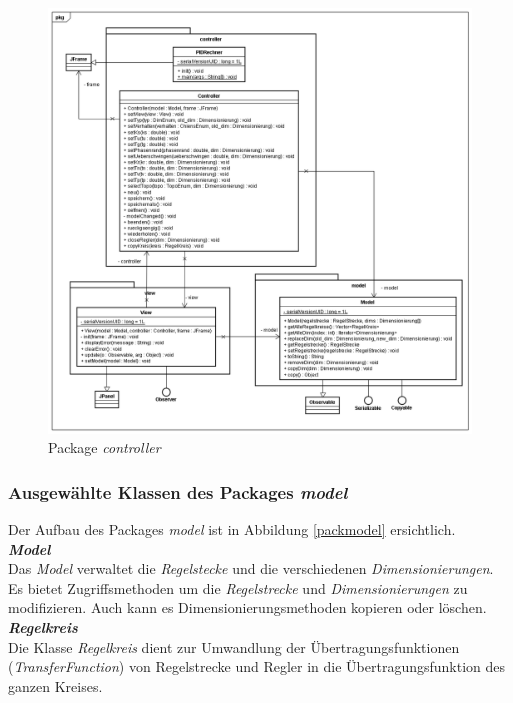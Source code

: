 \begin{figure}[p]
\centering
\includegraphics[width=1\textwidth]{packcontrl.png}
\caption{Package \textit{controller}}
\label{packcontrl}
\end{figure}

\newpage
\subsubsection{Ausgewählte Klassen des Packages \textit{model}}
Der Aufbau des Packages \textit{model} ist in Abbildung \ref{packmodel} ersichtlich.\\

\textit{\textbf{Model}}\\
Das \textit{Model} verwaltet die \textit{Regelstecke} und die verschiedenen \textit{Dimensionierungen}. Es bietet Zugriffsmethoden um die \textit{Regelstrecke} und \textit{Dimensionierungen} zu modifizieren. Auch kann es Dimensionierungsmethoden kopieren oder löschen.\\

\textit{\textbf{Regelkreis}}\\
Die Klasse \textit{Regelkreis} dient zur Umwandlung der Übertragungsfunktionen (\textit{TransferFunction}) von Regelstrecke und Regler in die Übertragungsfunktion des ganzen Kreises.\\

